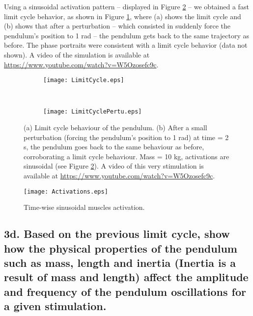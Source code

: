 \documentclass{cmc}
\begin{document}
Using a sinusoidal activation pattern -- displayed in Figure \ref{fig:acts} -- we obtained a fast limit cycle behavior, as shown in Figure \ref{figure:3c}, where (a) shows the limit cycle and (b) shows that after a perturbation -- which consisted in suddenly force the pendulum's position to 1 rad -- the pendulum gets back to the same trajectory as before. The phase portraits were consistent with a limit cycle behavior (data not shown). A video of the simulation is available at \url{https://www.youtube.com/watch?v=W5Ozosefc9c}. 

\begin{figure}[ht!]
    \centering
    \begin{subfigure}[t]{0.5\textwidth}
        \centering
        \texttt{[image: LimitCycle.eps]}
        \caption{}
    \end{subfigure}%
    ~ 
    \begin{subfigure}[t]{0.5\textwidth}
        \centering
        \texttt{[image: LimitCyclePertu.eps]}
        \caption{}
    \end{subfigure}
    \caption{ (a) Limit cycle behaviour of the pendulum. (b) After a small perturbation (forcing the pendulum's position to 1 rad) at time = 2 s, the pendulum goes back to the same behaviour as before, corroborating a limit cycle behaviour. Mass = 10 kg, activations are sinusoidal (see Figure \ref{fig:acts}). A video of this very stimulation is available at \url{https://www.youtube.com/watch?v=W5Ozosefc9c}.}
    \label{figure:3c}
\end{figure}

\begin{figure}[H]
  \centering
  \texttt{[image: Activations.eps]}
  \caption{Time-wise sinusoidal muscles activation.}
  \label{fig:acts}
\end{figure}

\subsection*{3d. Based on the previous limit cycle, show how the
  physical properties of the pendulum such as mass, length and inertia
  (Inertia is a result of mass and length) affect the amplitude and
  frequency of the pendulum oscillations for a given stimulation.}
\label{sec:3d}
\end{document}
